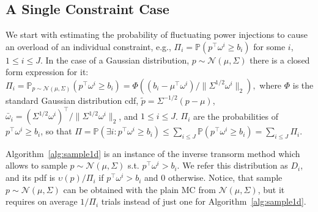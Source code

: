 \subsection{A Single Constraint Case}
We start with estimating the probability of fluctuating power injections to cause an overload of an individual constraint, e.g., $\Pi_i = \mathbb{P}(p^\top \omega^i \ge b_i)$ for some $i$, $1\le i \le J$. In the case of a Gaussian distribution, $p\sim \mathcal{N}(\mu,\Sigma)$ there is a closed form expression for it:
$%
\Pi_i  = \mathbb{P}_{p\sim \mathcal{N}(\mu, \Sigma)}(p^\top \omega^i \ge b_i) %
 = \Phi((b_i - \mu^\top \omega^i)/\|\Sigma^{1/2}\omega^i\|_2), 
$%
where $\Phi$ is the standard Gaussian distribution cdf, ${\tilde p} = \Sigma^{-1/2}(p-\mu)$, ${\bar\omega}_i = (\Sigma^{1/2}\omega^i)^\top/\|\Sigma^{1/2}\omega^i\|_2$, and $1\le i \le J$. $\Pi_i$ are the probabilities of $p^\top \omega^i \ge b_i$, so that 
$
    \Pi = \mathbb{P}(\exists i: p^\top \omega^i \ge b_i) \le \sum_{i\le J}\mathbb{P}(p^\top \omega^i \ge b_i) = \sum_{i\le J} \Pi_i.
$

Algorithm~\ref{alg:sample1d} is an instance of the inverse transorm method \cite{l2009monte} which allows to sample $p \sim \mathcal{N}(\mu, \Sigma)$ s.t. $p^\top \omega^i > b_i$. We refer this distribution as $D_i$, and its pdf is $\upsilon(p)/\Pi_i$ if $p^\top \omega^i > b_i$ and $0$ otherwise. Notice, that sample $p \sim \mathcal{N}(\mu, \Sigma)$ can be obtained with the plain MC from $\mathcal{N}(\mu, \Sigma)$, but it requires on average $1/\Pi_i$ trials instead of just one for Algorithm~\ref{alg:sample1d}.

